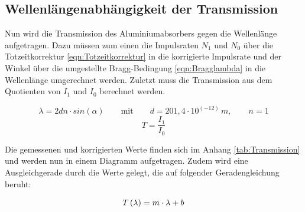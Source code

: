 \documentclass[titlepage = firstcover]{scrartcl}
\begin{document}
        \subsection{Wellenlängenabhängigkeit der Transmission}
        \noindent
        Nun wird die Transmission des Aluminiumabsorbers gegen die Wellenlänge aufgetragen. Dazu müssen zum einen die Impulsraten $N_1$ und $N_0$ über die 
        Totzeitkorrektur \ref{eqn:Totzeitkorrektur} in die korrigierte Impulsrate und der Winkel über die umgestellte Bragg-Bedingung \ref{eqn:Bragglambda} in die 
        Wellenlänge umgerechnet werden. Zuletzt muss die Transmission aus dem Quotienten von  $I_1$ und $I_0$ berechnet werden.

        \begin{equation}
            \lambda = 2dn \cdot sin(\alpha) \qquad \text{mit} \qquad d=201,4\cdot 10^{\left(-12\right)} \, m, \qquad n=1
            \label{eqn:Bragglambda}
        \end{equation}
        \begin{equation}
            T = \frac{I_1}{I_0}
            \label{eqn:Trans}
        \end{equation}
        
        \noindent
        Die gemessenen und korrigierten Werte finden sich im Anhang \ref{tab:Transmission} und werden nun in einem Diagramm aufgetragen. Zudem wird eine 
        Ausgleichgerade durch die Werte gelegt, die auf folgender Geradengleichung beruht:

        \begin{equation}
            T\left(\lambda \right) = m \cdot \lambda + b\\
            \label{eqn:Regression}
        \end{equation}
\end{document}
